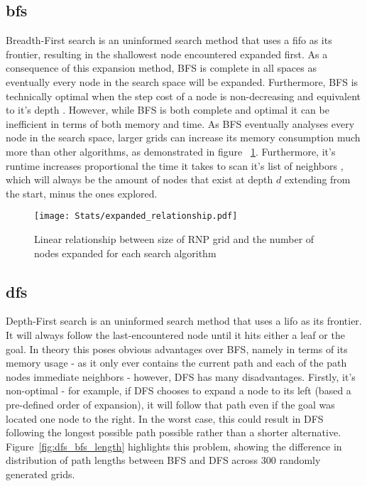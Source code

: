 \subsection{\texorpdfstring{\acrfull{bfs}}{BFS}} %
\label{sub:bfs}
Breadth-First search is an uninformed search method that uses a \acrfull{fifo} as its frontier, resulting in the shallowest node encountered expanded first. As a consequence of this expansion method, BFS is \gls{complete} in all spaces as eventually every node in the search space will be expanded. Furthermore, BFS is technically \gls{optimal} when the step cost of a node is non-decreasing and equivalent to it's depth \parencite[82]{aiama}. However, while BFS is both complete and optimal it can be inefficient in terms of both memory and time. As BFS eventually analyses every node in the search space, larger grids can increase its memory consumption much more than other algorithms, as demonstrated in figure ~\ref{fig:expanded_relationship}. Furthermore, it's runtime increases proportional the time it takes to scan it's list of neighbors \parencite[597]{introalgos}, which will always be the amount of nodes that exist at depth $d$ extending from the start, minus the ones explored.

\begin{figure}[H]
	\label{fig:expanded_relationship}
	\centerline{
		\texttt{[image: Stats/expanded\_relationship.pdf]}
	}
	\caption{Linear relationship between size of RNP grid and the number of nodes expanded for each search algorithm}
\end{figure}

\subsection{\texorpdfstring{\acrfull{dfs}}{DFS}} %
\label{sub:dfs}
Depth-First search is an uninformed search method that uses a \acrfull{lifo} as its frontier. It will always follow the last-encountered node until it hits either a \gls{leaf} or the goal. In theory this poses obvious advantages over BFS, namely in terms of its memory usage - as it only ever contains the current path and each of the path nodes immediate neighbors - however, DFS has many disadvantages. Firstly, it's non-optimal - for example, if DFS chooses to expand a node to its left (based a pre-defined order of expansion), it will follow that path even if the goal was located one node to the right. In the worst case, this could result in DFS following the longest possible path possible rather than a shorter alternative. Figure~\ref{fig:dfs_bfs_length} highlights this problem, showing the difference in distribution of path lengths between BFS and DFS across 300 randomly generated grids.


